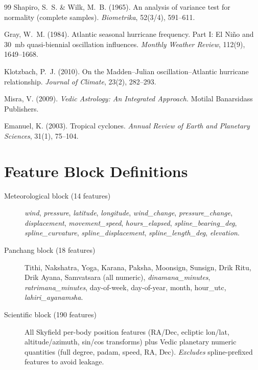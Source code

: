 \documentclass[12pt,a4paper]{article}
\begin{document}
\begin{thebibliography}{99}
    Shapiro, S.~S. \& Wilk, M.~B. (1965).
    An analysis of variance test for normality (complete samples).
    \textit{Biometrika}, 52(3/4), 591--611.

    Gray, W.~M. (1984).
    Atlantic seasonal hurricane frequency. Part I: El Ni\~no and 30~mb
    quasi-biennial oscillation influences.
    \textit{Monthly Weather Review}, 112(9), 1649--1668.

    Klotzbach, P.~J. (2010).
    On the Madden--Julian oscillation--Atlantic hurricane relationship.
    \textit{Journal of Climate}, 23(2), 282--293.

    Misra, V. (2009).
    \textit{Vedic Astrology: An Integrated Approach.}
    Motilal Banarsidass Publishers.

    Emanuel, K. (2003).
    Tropical cyclones.
    \textit{Annual Review of Earth and Planetary Sciences}, 31(1), 75--104.

    \end{thebibliography}

    \appendix

    \section{Feature Block Definitions}
    \label{app:blocks}

    \begin{description}
    \item[Meteorological block (14 features)] \textit{wind}, \textit{pressure},
        \textit{latitude}, \textit{longitude}, \textit{wind\_change},
        \textit{pressure\_change}, \textit{displacement}, \textit{movement\_speed},
        \textit{hours\_elapsed}, \textit{spline\_bearing\_deg},
        \textit{spline\_curvature}, \textit{spline\_displacement},
        \textit{spline\_length\_deg}, \textit{elevation}.
    \item[Panchang block (18 features)] Tithi, Nakshatra, Yoga, Karana,
        Paksha, Moonsign, Sunsign, Drik Ritu, Drik Ayana, Samvatsara (all numeric),
        \textit{dinamana\_minutes}, \textit{ratrimana\_minutes}, day-of-week,
        day-of-year, month, hour\_utc, \textit{lahiri\_ayanamsha}.
    \item[Scientific block (190 features)] All Skyfield per-body position
        features (RA/Dec, ecliptic lon/lat, altitude/azimuth, sin/cos transforms)
        plus Vedic planetary numeric quantities (full degree, padam, speed, RA,
        Dec). \emph{Excludes} spline-prefixed features to avoid leakage.
    \end{description}
\end{document}
